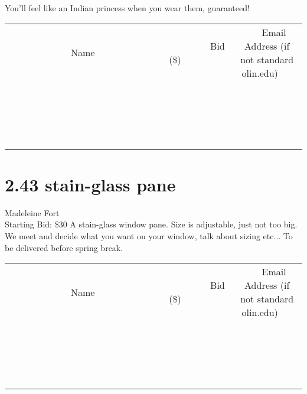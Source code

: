 \documentclass[11pt]{article}
\begin{document}
You'll feel like an Indian princess when you wear them, guaranteed!
\\[3ex]
\begin{tabular}{c c c}
~~~~~~~~~~~~~Name~~~~~~~~~~~~~ & ~~~~~~~~~Bid (\$)~~~~~~~~~  & ~~~Email Address (if not standard olin.edu)~~~\\
 & & \\
\hline
 & & \\
\hline
 & & \\
\hline
 & & \\
\hline
 & & \\
\hline
 & & \\
\hline
 & & \\
\hline
 & & \\
\hline
 & & \\
\hline
 & & \\
\hline
 & & \\
\hline
 & & \\
\hline
 & & \\
\hline
 & & \\
\hline
 & & \\
\hline
 & & \\
\hline
 & & \\
\hline
 & & \\
\hline
 & & \\
\hline
\end{tabular}
\newpage
\section*{2.43 stain-glass pane}
Madeleine Fort
\\
Starting Bid: \$30
\newline
A stain-glass window pane.  Size is adjustable, just not too big.  We meet and decide what you want on your window, talk about sizing etc...  To be delivered before spring break.
\\[3ex]
\begin{tabular}{c c c}
~~~~~~~~~~~~~Name~~~~~~~~~~~~~ & ~~~~~~~~~Bid (\$)~~~~~~~~~  & ~~~Email Address (if not standard olin.edu)~~~\\
 & & \\
\hline
 & & \\
\hline
 & & \\
\hline
 & & \\
\hline
 & & \\
\hline
 & & \\
\hline
 & & \\
\hline
 & & \\
\hline
 & & \\
\hline
 & & \\
\hline
 & & \\
\hline
 & & \\
\hline
 & & \\
\hline
 & & \\
\hline
 & & \\
\hline
 & & \\
\hline
 & & \\
\hline
 & & \\
\hline
 & & \\
\hline
\end{tabular}
\newpage
\end{document}
